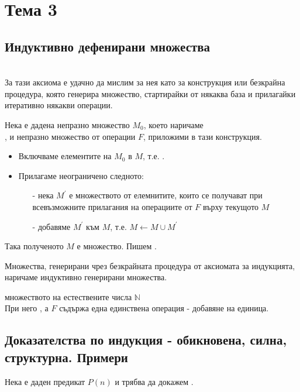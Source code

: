 \section{Тема 3}

\subsection{Индуктивно дефенирани множества}
 \\
За тази аксиома е удачно да мислим за нея като за конструкция или безкрайна процедура, която генерира
множество, стартирайки от някаква база и прилагайки итеративно някакви операции.

Нека е дадена непразно множество \(M_0\), което наричаме \\ , и непразно множество
от операции \(F\), приложими в тази конструкция.

\begin{itemize}
    \item Включваме елементите на \(M_0\) в \(M\), т.е. .
    \item Прилагаме неограничено следното:
        \begin{itemize}
            \item[-] нека \(M^{'}\) е множеството от елемнитите, които се получават при всевъзможните 
            прилагания на операциите от \(F\) върху текущото \(M\)
            \item[-] добавяме \(M^{'}\) към \(M\), т.е. \(M \leftarrow M \cup M^{'}\)
        \end{itemize}
\end{itemize}

Така полученото \(M\) е множество. Пишем .

Множества, генерирани чрез безкрайната процедура от аксиомата за индукцията, наричаме индуктивно генерирани
множества.

 множеството на естествените числа \(\mathbb{N}\) \\
При него , а \(F\) съдържа една единствена операция - добавяне на единица.

\subsection{Доказателства по индукция - обикновена, силна, структурна. Примери}
Нека е даден предикат \(P(n)\) и трябва да докажем .


